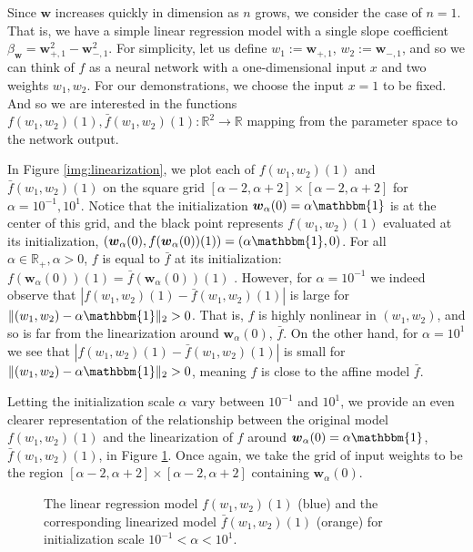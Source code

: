 \documentclass{article}
\begin{document}
Since $\boldsymbol{w}$ increases quickly in dimension as $n$ grows, we consider the case of $n =1$. That is, we have a simple linear regression model with a single slope coefficient $\beta_{\boldsymbol{w}} = \boldsymbol{w}_{+, 1}^2 - \boldsymbol{w}_{-, 1}^2$. For simplicity, let us define $w_1 := \boldsymbol{w}_{+, 1}$, $w_2 := \boldsymbol{w}_{-, 1}$, and so we can think of $f$ as a neural network with a one-dimensional input $x$ and two weights $w_1, w_2$. For our demonstrations, we choose the input $x = 1$ to be fixed. And so we are interested in the functions $f(w_1, w_2)(1), \bar{f}(w_1, w_2)(1): \mathbb{R}^2 \rightarrow \mathbb{R}$ mapping from the parameter space to the network output.

In Figure \ref{img:linearization}, we plot each of $f(w_1, w_2)(1)$ and $\bar{f}(w_1, w_2)(1)$ on the square grid $[\alpha - 2, \alpha + 2] \times [\alpha - 2, \alpha + 2]$ for $\alpha = 10^{-1}, 10^1$. Notice that the initialization $\boldsymbol{w}_{\alpha}(0) = \alpha \mathbbm{1}$ is at the center of this grid, and the black point represents $f(w_1, w_2)(1)$ evaluated at its initialization, $(\boldsymbol{w}_{\alpha}(0), f(\boldsymbol{w}_{\alpha}(0))(1)) = (\alpha \mathbbm{1}, 0)$. For all $\alpha \in \mathbb{R}_+, \alpha > 0$, $f$ is equal to $\bar{f}$ at its initialization: $f(\boldsymbol{w}_{\alpha}(0))(1) = \bar{f}(\boldsymbol{w}_{\alpha}(0))(1)$ . However, for $\alpha = 10^{-1}$ we indeed observe that $|f(w_1, w_2)(1) - \bar{f}(w_1, w_2)(1)|$ is large for $\| (w_1, w_2) - \alpha \mathbbm{1} \|_2 > 0$. That is, $f$ is highly nonlinear in $(w_1, w_2)$, and so is far from the linearization around $\boldsymbol{w}_{\alpha}(0)$, $\bar{f}$. On the other hand, for $\alpha = 10^1$ we see that $|f(w_1, w_2)(1) - \bar{f}(w_1, w_2)(1) |$ is small for $\| (w_1, w_2) - \alpha \mathbbm{1} \|_2 > 0$, meaning $f$ is close to the affine model $\bar{f}$. 

Letting the initialization scale $\alpha$ vary between $10^{-1}$ and $10^{1}$, we provide an even clearer representation of the relationship between the original model $f(w_1, w_2)(1)$ and the linearization of $f$ around $\boldsymbol{w}_{\alpha}(0) = \alpha \mathbbm{1}$, $\bar{f}(w_1, w_2)(1)$, in Figure \ref{gif:linearization}. Once again, we take the grid of input weights to be the region $[\alpha - 2, \alpha + 2] \times [\alpha - 2, \alpha + 2]$ containing $\boldsymbol{w}_{\alpha}(0)$.

\begin{figure}[H]
\caption{The linear regression model $f(w_1, w_2)(1)$ (blue) and the corresponding linearized model $\bar{f}(w_1, w_2)(1)$ (orange) for initialization scale $10^{-1} < \alpha < 10^1$.}\label{gif:linearization}
\end{figure}
\end{document}
